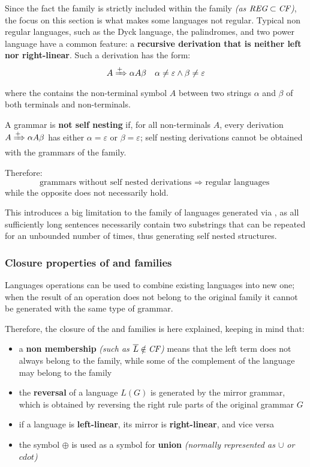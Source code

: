 \documentclass[english]{article}
\begin{document}
Since the fact the \REG family is strictly included within the \CF family \textit{(as \(\textit{REG} \subset \textit{CF}\))}, the focus on this section is what makes some languages not regular.
Typical non regular languages, such as the Dyck language, the palindromes, and two power language have a common feature:
a \textbf{recursive derivation that is neither left nor right-linear}.
Such a derivation has the form:
\[ A \xRightarrow{+} \alpha A \beta \quad \alpha \neq \varepsilon \land \beta \neq \varepsilon \]
where the \RP contains the non-terminal symbol \(A\) between two strings \(\alpha\) and \(\beta\) of both terminals and non-terminals.

\bigskip
A grammar is \textbf{not self nesting} if, for all non-terminals \(A\), every derivation \(A \xRightarrow{+} \alpha A \beta\) has either \(\alpha = \varepsilon\) or \(\beta = \varepsilon\);
self nesting derivations cannot be obtained with the grammars of the \REG family.

Therefore:
\[ \text{grammars without self nested derivations } \Rightarrow \text{ regular languages } \]
while the opposite does not necessarily hold.

\bigskip
This introduces a big limitation to the family of languages generated via \re, as all sufficiently long sentences necessarily contain two substrings that can be repeated for an unbounded number of times, thus generating self nested structures.

\subsubsection{Closure properties of \REG and \CF families}
\label{sec:closure-properties-reg-and-cf}

Languages operations can be used to combine existing languages into new one;
when the result of an operation does not belong to the original family it cannot be generated with the same type of grammar.

Therefore, the closure of the \REG and \CF families is here explained, keeping in mind that:

\begin{itemize}
  \item a \textbf{non membership} \textit{(such as \(\overline{L} \notin \textit{CF}\))} means that the left term does not always belong to the family, while some of the complement of the language may belong to the family
  \item the \textbf{reversal} of a language \(L(G)\) is generated by the mirror grammar, which is obtained by reversing the right rule parts of the original grammar \(G\)
  \item if a language is \textbf{left-linear}, its mirror is \textbf{right-linear}, and vice versa
  \item the symbol \(\oplus\) is used as a symbol for \textbf{union} \textit{(normally represented as \(\cup\) or \(cdot\))}
\end{itemize}
\end{document}
